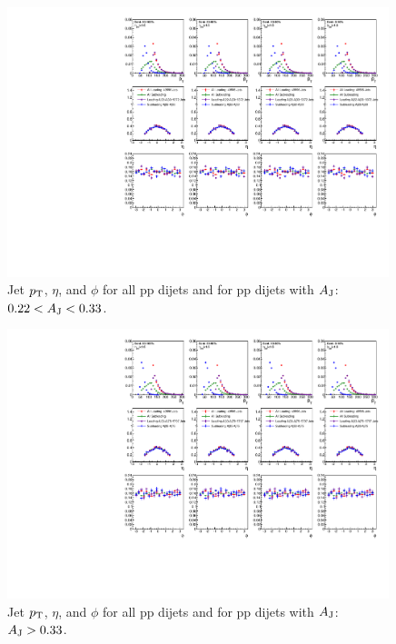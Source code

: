 \begin{figure}[htbp]
\begin{center}
\includegraphics[width=0.99\textwidth]{figures/Appendices/JetSummary_pp_Aj22_Aj33.pdf}
\caption{
Jet $p_{\rm T}$, $\eta$, and $\phi$ for all  pp dijets and for  pp dijets with $A_{\rm J}$:  $0.22<A_{\rm J}<0.33$.  
}
\label{fig:JetKin ppAj22Aj33}
\end{center}
\end{figure}


\begin{figure}[htbp]
\begin{center}
\includegraphics[width=0.99\textwidth]{figures/Appendices/JetSummary_pp_Aj33_Aj75.pdf}
\caption{
Jet $p_{\rm T}$, $\eta$, and $\phi$ for all  pp dijets and for  pp dijets with $A_{\rm J}$:  $A_{\rm J}>0.33$.  
}
\label{fig:JetKinppAj33Aj75}
\end{center}
\end{figure}


